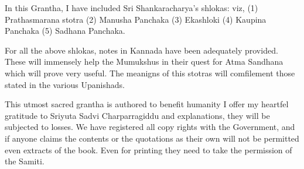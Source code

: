 In this Grantha, I have included Sri Shankaracharya's shlokas: viz, (1) Prathasmarana stotra (2) Manusha Panchaka (3) Ekashloki (4) Kaupina Panchaka (5) Sadhana Panchaka.

For all the above shlokas, notes in Kannada have been adequately provided. These will immensely help the Mumukshus in their quest for Atma Sandhana which will prove very useful. The meanigns of this stotras will comfilement those stated in the various Upanishads.

This utmost sacred grantha is authored to benefit humanity I offer my heartfel gratitude to Sriyuta Sadvi Charparragiddu and explanations, they will be subjected to losses. We have registered all copy rights with the Government, and if anyone claims the contents or the quotations as their own will not be permitted even extracts of the book. Even for printing they need to take the permission of the Samiti.

\delimiter

\chapter*{}

\begin{verse}
\end{verse}

\begin{verse}
\end{verse}

\begin{verse}
\end{verse}

\begin{verse}
\end{verse}

\begin{verse}
\end{verse}

\begin{verse}
\end{verse}

